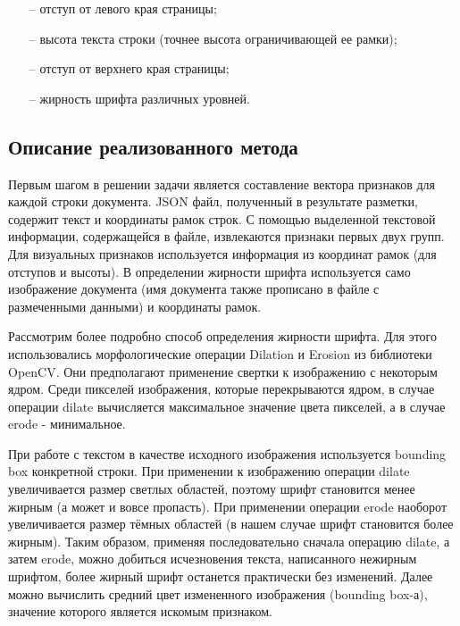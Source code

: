 \documentclass{ProcISPRAS}
\begin{document}
\begin{itemize}
  \begin{itemize}

    \item[--] отступ от левого края страницы;
    \item[--] высота текста строки (точнее высота ограничивающей ее рамки);
    \item[--] отступ от верхнего края страницы;
    \item[--] жирность шрифта различных уровней.

  \end{itemize}

\end{itemize}

\subsection{Описание реализованного метода}

Первым шагом в решении задачи является составление вектора признаков для каждой строки документа. JSON файл, полученный в результате разметки, содержит текст и координаты рамок строк. С помощью выделенной текстовой информации, содержащейся в файле, извлекаются признаки первых двух групп. Для визуальных признаков используется информация из координат рамок (для отступов и высоты). В определении жирности шрифта используется само изображение документа (имя документа также прописано в файле с размеченными данными) и координаты рамок.

Рассмотрим более подробно способ определения жирности шрифта. Для этого использовались морфологические операции Dilation и Erosion из библиотеки OpenCV. Они предполагают применение свертки к изображению с некоторым ядром. Среди пикселей изображения, которые перекрываются ядром, в случае операции dilate вычисляется максимальное значение цвета пикселей, а в случае erode - минимальное. 

При работе с текстом в качестве исходного изображения используется bounding box конкретной строки. При применении к изображению операции dilate увеличивается размер светлых областей, поэтому шрифт становится менее жирным (а может и вовсе пропасть). При применении операции erode наоборот увеличивается размер тёмных областей (в нашем случае шрифт становится более жирным). Таким образом, применяя последовательно сначала операцию dilate, а затем erode, можно добиться исчезновения текста, написанного нежирным шрифтом, более жирный шрифт останется практически без изменений. Далее можно вычислить средний цвет измененного изображения (bounding box-а), значение которого является искомым признаком.  
\end{document}
